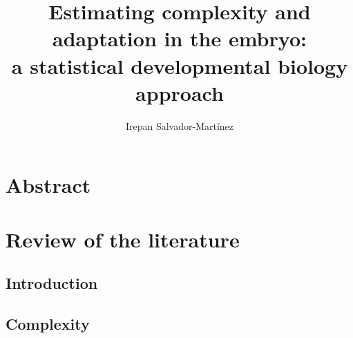 \documentclass[officiallayout]{tktla_modified}
\title{Estimating complexity and adaptation 
in the embryo:
\\ a statistical developmental biology approach
}
\author{Irepan Salvador-Mart\'inez}
\begin{document}
\frontmatter

\maketitle
\makenomenclature

\begin{acknowledgements}
  
\end{acknowledgements}


\tableofcontents

\mainmatter





\printnomenclature


\chapter{Abstract}
	


\chapter{Review of the literature}

\section{Introduction}
	
	\clearpage 	
	

\section{Complexity}
	
	\clearpage 
\end{document}

